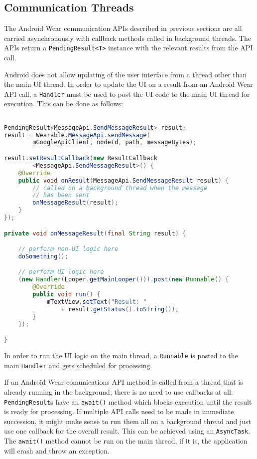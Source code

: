 \subsection{Communication Threads}

The Android Wear communication APIs described in previous sections are all
carried asynchronously with callback methods called in background threads.
The APIs return a \texttt{PendingResult<T>} instance with the relevant
results from the API call.

Android does not allow updating of the user interface from a thread other than
the main UI thread. In order to update the UI on a result from an Android Wear
API call, a \texttt{Handler} must be used to post the UI code to the main UI
thread for execution. This can be done as follows:

\begin{lstlisting}[language=Java]

PendingResult<MessageApi.SendMessageResult> result;
result = Wearable.MessageApi.sendMessage(
        mGoogleApiClient, nodeId, path, messageBytes);

result.setResultCallback(new ResultCallback
        <MessageApi.SendMessageResult>() {
    @Override
    public void onResult(MessageApi.SendMessageResult result) {
        // called on a background thread when the message
        // has been sent
        onMessageResult(result);
    }
});

private void onMessageResult(final String result) {

    // perform non-UI logic here
    doSomething();

    // perform UI logic here
    (new Handler(Looper.getMainLooper())).post(new Runnable() {
        @Override
        public void run() {
            mTextView.setText("Result: "
                + result.getStatus().toString());
        }
    });

}

\end{lstlisting}

In order to run the UI logic on the main thread, a \texttt{Runnable} is posted
to the main \texttt{Handler} and gets scheduled for processing.

If an Android Wear comunications API method is called from a thread that is
already running in the background, there is no need to use callbacks at all.
\texttt{PendingResult}s have an \texttt{await()} method which blocks execution
until the result is ready for processing. If multiple API calls need to be made
in immediate succession, it might make sense to run them all on a background
thread and just use one callback for the overall result. This can be achieved
using an \texttt{AsyncTask}. The \texttt{await()} method cannot be run on the
main thread, if it is, the application will crash and throw an exception.

